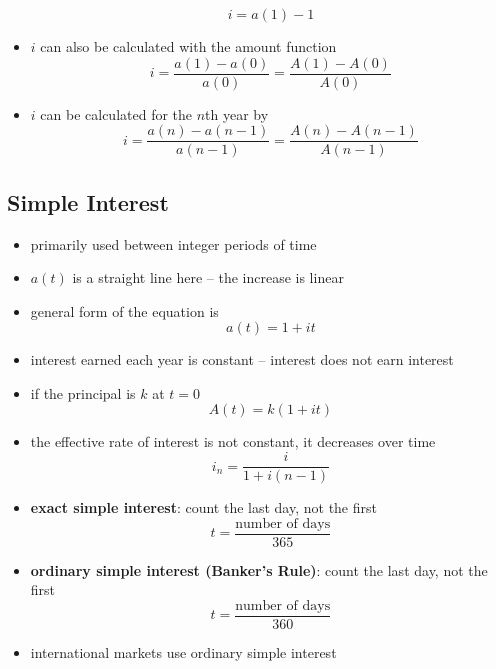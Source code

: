 \documentclass[../00_main.tex]{subfiles}
\begin{document}
\begin{itemize}
\begin{equation}
            i = a(1) - 1
        \end{equation}
    \item $i$ can also be calculated with the amount function
        \begin{equation}\nonumber
            i = \frac{a(1)-a(0)}{a(0)} = \frac{A(1)-A(0)}{A(0)}
        \end{equation}
    \item $i$ can be calculated for the $n$th year by
        \begin{equation}\nonumber
            i = \frac{a(n)-a(n-1)}{a(n-1)} = \frac{A(n)-A(n-1)}{A(n-1)}
        \end{equation}
\end{itemize}

\subsection{Simple Interest}

\begin{itemize}
    \item primarily used between integer periods of time
    \item $a(t)$ is a straight line here -- the increase is linear
    \item general form of the equation is 
        \begin{equation}\nonumber
            a(t) = 1 + it
        \end{equation}
    \item interest earned each year is constant -- interest does not earn
        interest
    \item if the principal is $k$ at $t=0$
        \begin{equation}\nonumber
            A(t) = k(1+it)
        \end{equation}
    \item the effective rate of interest is not constant, it decreases over
        time
        \begin{equation}\nonumber
            i_n = \frac{i}{1 + i(n-1)}
        \end{equation}
    \item \textbf{exact simple interest}: count the last day, not the first
        \begin{equation}\nonumber
            t = \frac{\text{number of days}}{365}
        \end{equation}
    \item \textbf{ordinary simple interest (Banker's Rule)}: count the last 
        day, not the first
        \begin{equation}\nonumber
            t = \frac{\text{number of days}}{360}
        \end{equation}
    \item international markets use ordinary simple interest
\end{itemize}
\end{document}
